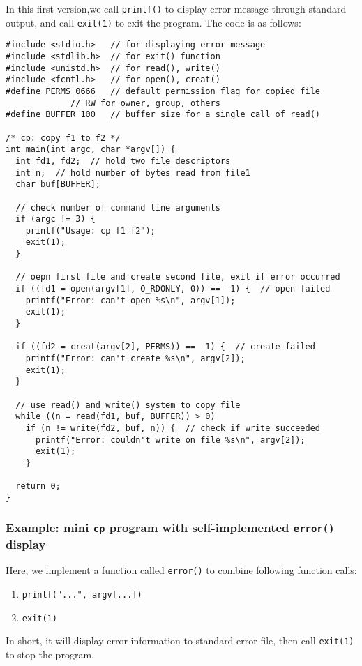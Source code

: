 \documentclass[11pt]{article}
\begin{document}
In this first version,we call \texttt{printf()} to display error message through standard output, and call \texttt{exit(1)} to exit the program. The code is as follows:
\begin{verbatim}
#include <stdio.h>   // for displaying error message
#include <stdlib.h>  // for exit() function
#include <unistd.h>  // for read(), write()
#include <fcntl.h>   // for open(), creat()
#define PERMS 0666   // default permission flag for copied file
		     // RW for owner, group, others
#define BUFFER 100   // buffer size for a single call of read()

/* cp: copy f1 to f2 */                    
int main(int argc, char *argv[]) {
  int fd1, fd2;  // hold two file descriptors
  int n;  // hold number of bytes read from file1
  char buf[BUFFER];

  // check number of command line arguments
  if (argc != 3) {
    printf("Usage: cp f1 f2");
    exit(1);
  }

  // oepn first file and create second file, exit if error occurred
  if ((fd1 = open(argv[1], O_RDONLY, 0)) == -1) {  // open failed
    printf("Error: can't open %s\n", argv[1]);
    exit(1);
  }

  if ((fd2 = creat(argv[2], PERMS)) == -1) {  // create failed
    printf("Error: can't create %s\n", argv[2]);
    exit(1);
  }

  // use read() and write() system to copy file
  while ((n = read(fd1, buf, BUFFER)) > 0)
    if (n != write(fd2, buf, n)) {  // check if write succeeded
      printf("Error: couldn't write on file %s\n", argv[2]);
      exit(1);
    }

  return 0;
}                    
\end{verbatim}
\subsubsection{Example: mini \texttt{cp} program with self-implemented \texttt{error()} display}
\label{sec:org9c17288}
Here, we implement a function called \texttt{error()} to combine following function calls:
\begin{enumerate}
\item \texttt{printf("...", argv[...])}
\item \texttt{exit(1)}
\end{enumerate}

In short, it will display error information to standard error file, then call \texttt{exit(1)} to stop the program.
\end{document}
